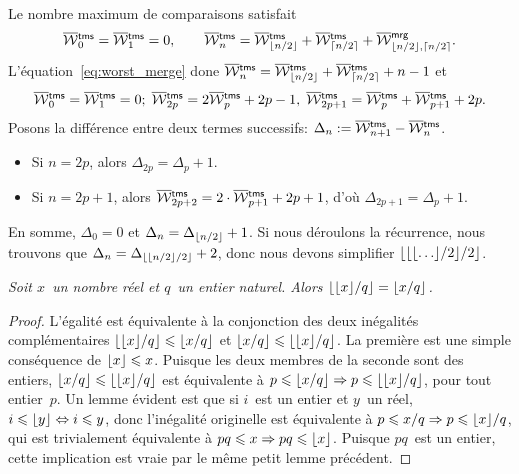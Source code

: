 Le nombre maximum de comparaisons satisfait
\begin{equation*}
\OW{\fun{tms}}{0} = \OW{\fun{tms}}{1} = 0,
\qquad
\OW{\fun{tms}}{n} = \OW{\fun{tms}}{\floor{n/2}}
+ \OW{\fun{tms}}{\ceiling{n/2}}
+ \OW{\fun{mrg}}{\floor{n/2},\ceiling{n/2}}.
\index{tms@$\OW{\fun{tms}}{n}$|(}
\index{mrg@\fun{mrg/2}}
\end{equation*}
L'équation~\eqref{eq:worst_merge}  done
\(\OW{\fun{tms}}{n} = \OW{\fun{tms}}{\floor{n/2}} +
\OW{\fun{tms}}{\ceiling{n/2}} + n - 1\) et
\begin{equation*}
\OW{\fun{tms}}{0} = \OW{\fun{tms}}{1} = 0;\;
\OW{\fun{tms}}{2p} = 2\OW{\fun{tms}}{p} + 2p - 1,\;
\OW{\fun{tms}}{2p+1} = \OW{\fun{tms}}{p} + \OW{\fun{tms}}{p+1} + 2p.
\end{equation*}
Posons la différence entre deux termes successifs: \(\Delta_n :=
\smash[t]{\OW{\fun{tms}}{n+1}} - \OW{\fun{tms}}{n}\).
\begin{itemize}

  \item Si \(n=2p\), alors \(\Delta_{2p} = \Delta_{p} + 1\).

  \item Si \(n=2p+1\), alors \(\OW{\fun{tms}}{2p+2} = 2 \cdot
  \OW{\fun{tms}}{p+1} + 2p + 1\), d'où \(\Delta_{2p+1} = \Delta_{p} +
  1\).

\end{itemize}
En somme, \(\Delta_0 = 0\) et \(\Delta_n = \Delta_{\lfloor{n/2}\rfloor} +
1\). Si nous déroulons la récurrence, nous trouvons que \(\Delta_n =
\Delta_{\lfloor{\lfloor{n/2}\rfloor/2}\rfloor}+ 2\), donc nous devons simplifier
\(\lfloor{\lfloor{\lfloor{\dots}\rfloor/2}\rfloor/2}\rfloor\).
\begin{thm}
\label{thm_floors}
\textsl{Soit \(x\)~un nombre réel et \(q\)~un entier naturel. Alors
  \(\lfloor{\lfloor{x}\rfloor/q}\rfloor = \lfloor{x/q}\rfloor\).}
\end{thm}
\begin{proof}
  L'égalité est équivalente à la conjonction des deux inégalités
  complémentaires \(\lfloor{\lfloor{x}\rfloor/q}\rfloor \leqslant \lfloor{x/q}\rfloor\) et
  \(\lfloor{x/q}\rfloor \leqslant \lfloor{\lfloor{x}\rfloor/q}\rfloor\). La première est une
  simple conséquence de \(\lfloor{x}\rfloor \leqslant x\). Puisque les deux
  membres de la seconde sont des entiers, \(\lfloor{x/q}\rfloor \leqslant
  \lfloor{\lfloor{x}\rfloor/q}\rfloor\) est équivalente à \(p \leqslant \lfloor{x/q}\rfloor
  \Rightarrow p \leqslant \lfloor{\lfloor{x}\rfloor/q}\rfloor\), pour tout
  entier~\(p\). Un lemme évident est que si \(i\)~est un entier et
  \(y\)~un réel, \(i \leqslant \lfloor{y}\rfloor \Leftrightarrow i
  \leqslant y\), donc l'inégalité originelle est équivalente à
  \(p \leqslant x/q \Rightarrow p \leqslant \lfloor{x}\rfloor/q\), qui est
  trivialement équivalente à \(pq \leqslant x \Rightarrow pq \leqslant
  \lfloor{x}\rfloor\). Puisque \(pq\)~est un entier, cette implication est
  vraie par le même petit lemme précédent.
\end{proof}
